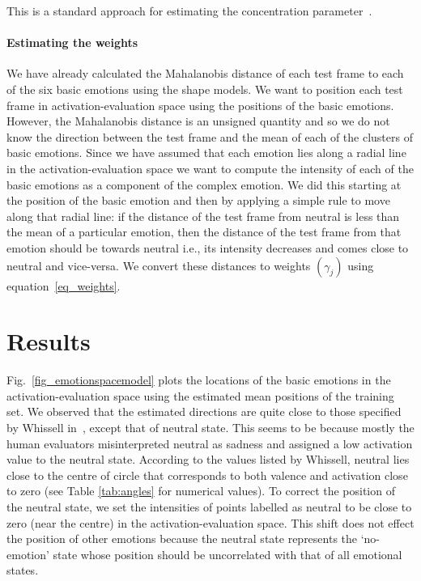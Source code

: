 \documentclass[10pt,journal,cspaper,compsoc]{IEEEtran}
\begin{document}
\noindent This is a standard approach for estimating the concentration parameter~\cite{fisher1995statistical, mardia1972statistics}.

\paragraph{Estimating the weights}
\label{sec_est_weight}
We have already calculated the Mahalanobis distance of each test frame to each of the six basic emotions using the shape models. We want to position each test frame in activation-evaluation space using the positions of the basic emotions. However, the Mahalanobis distance is an unsigned quantity and so we do not know the direction between the test frame and the mean of each of the clusters of basic emotions. Since we have assumed that each emotion lies along a radial line in the activation-evaluation space we want to compute the intensity of each of the basic emotions as a component of the complex emotion. We did this starting at the position of the basic emotion and then by applying a simple rule to move along that radial line: if the distance of the test frame from neutral is less than the mean of a particular emotion, then the distance of the test frame from that emotion should be towards neutral i.e., its intensity decreases and comes close to neutral and vice-versa. We convert these distances to weights $(\gamma_{j})$ using equation~\ref{eq_weights}.

\section{Results}
\label{sec_results}
Fig.~\ref{fig_emotionspacemodel} plots the locations of the basic emotions in the activation-evaluation space using the estimated mean positions of the training set. We observed that the estimated directions are quite close to those specified by Whissell in~\cite{Whissell89}, except that of neutral state. This seems to be because mostly the human evaluators misinterpreted neutral as sadness and assigned a low activation value to the neutral state. According to the values listed by Whissell, neutral lies close to the centre of circle that corresponds to both valence and activation close to zero (see Table \ref{tab:angles} for numerical values). To correct the position of the neutral state, we set the intensities of points labelled as neutral to be close to zero (near the centre) in the activation-evaluation space. This shift does not effect the position of other emotions because the neutral state represents the `no-emotion' state whose position should be uncorrelated with that of all emotional states.
\end{document}
